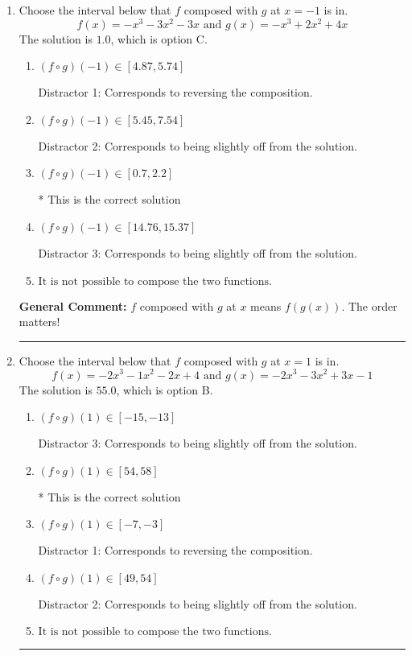 \documentclass{extbook}[14pt]
\newcommand{\litem}[1]{\item #1

\rule{\textwidth}{0.4pt}}
\begin{document}
\begin{enumerate}\litem{
Choose the interval below that $f$ composed with $g$ at $x=-1$ is in.
\[ f(x) = -x^{3} -3 x^{2} -3 x \text{ and } g(x) = -x^{3} +2 x^{2} +4 x \]The solution is \( 1.0 \), which is option C.\begin{enumerate}[label=\Alph*.]
\item \( (f \circ g)(-1) \in [4.87, 5.74] \)

 Distractor 1: Corresponds to reversing the composition.
\item \( (f \circ g)(-1) \in [5.45, 7.54] \)

 Distractor 2: Corresponds to being slightly off from the solution.
\item \( (f \circ g)(-1) \in [0.7, 2.2] \)

* This is the correct solution
\item \( (f \circ g)(-1) \in [14.76, 15.37] \)

 Distractor 3: Corresponds to being slightly off from the solution.
\item \( \text{It is not possible to compose the two functions.} \)


\end{enumerate}

\textbf{General Comment:} $f$ composed with $g$ at $x$ means $f(g(x))$. The order matters!
}
\litem{
Choose the interval below that $f$ composed with $g$ at $x=1$ is in.
\[ f(x) = -2x^{3} -1 x^{2} -2 x + 4 \text{ and } g(x) = -2x^{3} -3 x^{2} +3 x -1 \]The solution is \( 55.0 \), which is option B.\begin{enumerate}[label=\Alph*.]
\item \( (f \circ g)(1) \in [-15, -13] \)

 Distractor 3: Corresponds to being slightly off from the solution.
\item \( (f \circ g)(1) \in [54, 58] \)

* This is the correct solution
\item \( (f \circ g)(1) \in [-7, -3] \)

 Distractor 1: Corresponds to reversing the composition.
\item \( (f \circ g)(1) \in [49, 54] \)

 Distractor 2: Corresponds to being slightly off from the solution.
\item \( \text{It is not possible to compose the two functions.} \)


\end{enumerate}

}
\end{enumerate}
\end{document}

